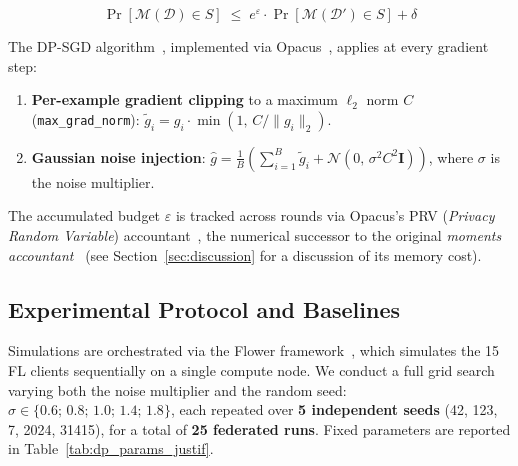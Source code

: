 \documentclass{article}
\begin{document}
\begin{equation}
  \Pr[\mathcal{M}(\mathcal{D}) \in S] \;\leq\; e^\varepsilon \cdot
  \Pr[\mathcal{M}(\mathcal{D}') \in S] + \delta
  \label{eq:dp_form}
\end{equation}

The DP-SGD algorithm~\cite{abadi2016deep}, implemented via
Opacus~\cite{opacus}, applies at every gradient step:

\begin{enumerate}
  \item \textbf{Per-example gradient clipping} to a maximum $\ell_2$ norm $C$
  (\texttt{max\_grad\_norm}):
  $\tilde{g}_i = g_i \cdot \min\!\left(1,\, C / \|g_i\|_2\right)$.
  \item \textbf{Gaussian noise injection}:
  $\hat{g} = \frac{1}{B}\!\left(\sum_{i=1}^B \tilde{g}_i +
  \mathcal{N}\!\left(0,\, \sigma^2 C^2 \mathbf{I}\right)\right)$,
  where $\sigma$ is the noise multiplier.
\end{enumerate}

The accumulated budget $\varepsilon$ is tracked across rounds via Opacus's PRV
(\textit{Privacy Random Variable}) accountant~\cite{opacus}, the numerical
successor to the original \textit{moments accountant}~\cite{abadi2016deep} (see
Section~\ref{sec:discussion} for a discussion of its memory cost).

\subsection{Experimental Protocol and Baselines}
\label{subsec:protocol}

Simulations are orchestrated via the Flower framework~\cite{beutel2020flower},
which simulates the 15 FL clients sequentially on a single compute node. We conduct
a full grid search varying both the noise multiplier and the random seed:
$\sigma \in \{0.6;\, 0.8;\, 1.0;\, 1.4;\, 1.8\}$, each repeated over \textbf{5
independent seeds} (42, 123, 7, 2024, 31415), for a total of \textbf{25 federated
runs}. Fixed parameters are reported in Table~\ref{tab:dp_params_justif}.
\end{document}
